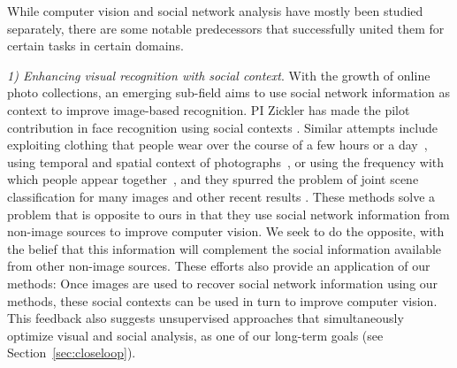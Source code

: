
While computer vision and social network analysis have mostly been studied separately, there are some notable predecessors that successfully united them for certain tasks in certain domains.

\emph{1) Enhancing visual recognition with social context}. With the growth of online photo collections, an emerging sub-field aims to use social network information as context to improve image-based recognition. PI Zickler has made the pilot contribution in face recognition using social contexts \cite{Stone2008,Stone2010}. Similar attempts include exploiting clothing that people wear over the course of a few hours or a day~\cite{anguelov2007cir, zhang2003aah,  song2006cah, sivic2006fpr}, using temporal and spatial context of photographs~\cite{naaman2005lcr, zhao2006apa}, or using the frequency with which people appear together~\cite{anguelov2007cir}, and they spurred the problem of joint scene classification for many images \cite{McAuley:socialclassify} and other recent results \cite{Dikmen:classify,LeeBMVC2011,Poppe2012,occupation2013}. These methods solve a problem that is opposite to ours in that they use social network information from non-image sources to improve computer vision. We seek to do the opposite, with the belief that this information will complement the social information available from other non-image sources. These efforts also provide an application of our methods: Once images are used to recover social network information using our methods, these social contexts can be used in turn to improve computer vision. This feedback also suggests unsupervised approaches that simultaneously optimize visual and social analysis, as one of our long-term goals (see Section~\ref{sec:closeloop}).


